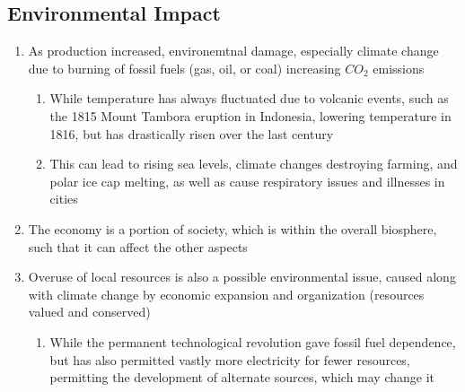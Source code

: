 \documentclass[11 pt, twoside]{article}
\begin{document}
\subsection{Environmental Impact}
\begin{enumerate}
\item As production increased, environemtnal damage, especially climate change due to burning of fossil fuels (gas, oil, or coal) increasing $CO_2$ emissions
\begin{enumerate}
\item While temperature has always fluctuated due to volcanic events, such as the 1815 Mount Tambora eruption in Indonesia, lowering temperature in 1816, but has drastically risen over the last century
\item This can lead to rising sea levels, climate changes destroying farming, and polar ice cap melting, as well as cause respiratory issues and illnesses in cities
\end{enumerate}
\item The economy is a portion of society, which is within the overall biosphere, such that it can affect the other aspects
\item Overuse of local resources is also a possible environmental issue, caused along with climate change by economic expansion and organization (resources valued and conserved)
\begin{enumerate}
\item While the permanent technological revolution gave fossil fuel dependence, but has also permitted vastly more electricity for fewer resources, permitting the development of alternate sources, which may change it
\end{enumerate}
\end{enumerate}
\end{document}
